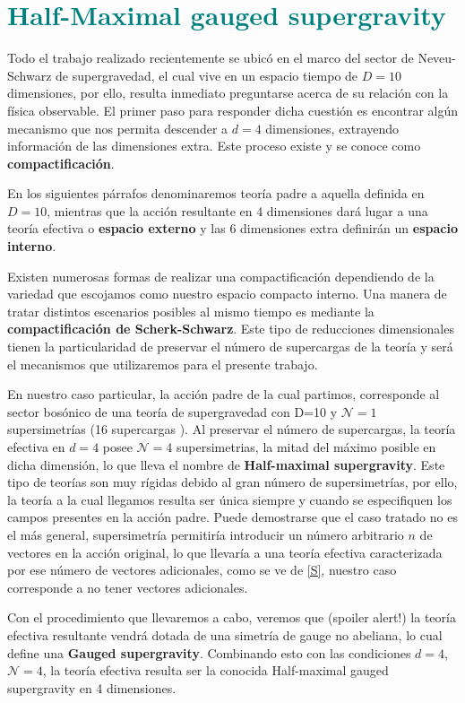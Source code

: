 \documentclass{article}
\numberwithin{equation}{section}
\begin{document}
\section{\textcolor{teal}{Half-Maximal gauged supergravity}}

Todo el trabajo realizado recientemente se ubicó en el marco del sector de Neveu-Schwarz de supergravedad, el cual vive en un espacio tiempo de $ D=10 $ dimensiones, por ello, resulta inmediato preguntarse acerca de su relación con la física observable. El primer paso para responder dicha cuestión es encontrar algún mecanismo que nos permita descender a $ d=4 $ dimensiones, extrayendo información de las dimensiones extra. Este proceso existe y se conoce como \textbf{compactificación}. 

En los siguientes párrafos denominaremos teoría padre a aquella definida en $ D=10 $, mientras que la acción resultante en 4 dimensiones dará lugar a una teoría efectiva o \textbf{espacio externo} y las 6 dimensiones extra definirán un \textbf{espacio interno}.

Existen numerosas formas de realizar una compactificación dependiendo de la variedad que escojamos como nuestro espacio compacto interno. Una manera de tratar distintos escenarios posibles al mismo tiempo es mediante la \textbf{compactificación de Scherk-Schwarz}. Este tipo de reducciones dimensionales tienen la particularidad de preservar el número de supercargas de la teoría y será el mecanismos que utilizaremos para el presente trabajo. 

En nuestro caso particular, la acción padre de la cual partimos, corresponde al sector bosónico de una teoría de supergravedad con D=10 y $ \mathcal{N}=1 $ supersimetrías (16 supercargas ). Al preservar el número de supercargas, la teoría efectiva en $ d=4 $ posee $ \mathcal{N}=4 $ supersimetrias, la mitad del máximo posible en dicha dimensión, lo que lleva el nombre de \textbf{Half-maximal supergravity}. Este tipo de teorías son muy rígidas debido al gran número de supersimetrías, por ello, la teoría a la cual llegamos resulta ser única siempre y cuando se especifiquen los campos presentes en la acción padre. Puede demostrarse que el caso tratado no es el más general, supersimetría permitiría introducir un número arbitrario $ n $ de vectores en la acción original, lo que llevaría a una teoría efectiva caracterizada por ese número de vectores adicionales, como se ve de \ref{S}, nuestro caso corresponde a no tener vectores adicionales.

Con el procedimiento que llevaremos a cabo, veremos que (spoiler alert!) la teoría efectiva resultante vendrá dotada de una simetría de gauge no abeliana, lo cual define una \textbf{Gauged supergravity}. Combinando esto con las condiciones $ d=4 $, $ \mathcal{N}=4 $, la teoría efectiva resulta ser la conocida Half-maximal gauged supergravity en 4 dimensiones.
\end{document}
